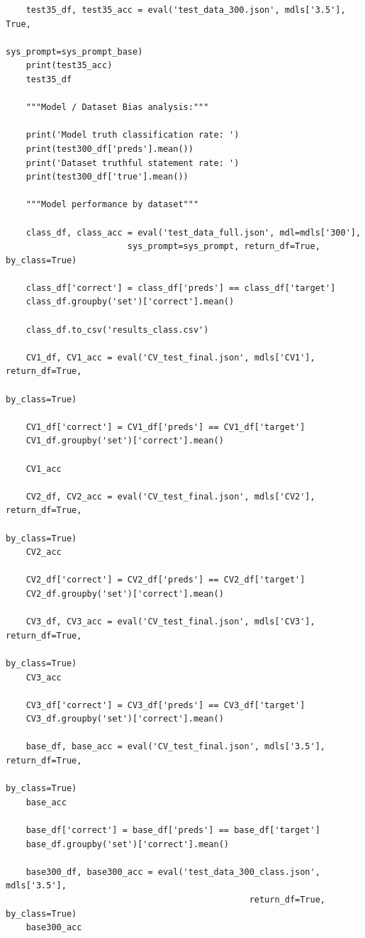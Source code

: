 \documentclass[10pt,twocolumn,letterpaper]{article}
\begin{document}
\begin{verbatim}
    test35_df, test35_acc = eval('test_data_300.json', mdls['3.5'], True, 
                                                        sys_prompt=sys_prompt_base)
    print(test35_acc)
    test35_df
    
    """Model / Dataset Bias analysis:"""
    
    print('Model truth classification rate: ')
    print(test300_df['preds'].mean())
    print('Dataset truthful statement rate: ')
    print(test300_df['true'].mean())
    
    """Model performance by dataset"""
    
    class_df, class_acc = eval('test_data_full.json', mdl=mdls['300'], 
                        sys_prompt=sys_prompt, return_df=True, by_class=True)
    
    class_df['correct'] = class_df['preds'] == class_df['target']
    class_df.groupby('set')['correct'].mean()
    
    class_df.to_csv('results_class.csv')
    
    CV1_df, CV1_acc = eval('CV_test_final.json', mdls['CV1'], return_df=True, 
                                                                by_class=True)
    
    CV1_df['correct'] = CV1_df['preds'] == CV1_df['target']
    CV1_df.groupby('set')['correct'].mean()
    
    CV1_acc
    
    CV2_df, CV2_acc = eval('CV_test_final.json', mdls['CV2'], return_df=True, 
                                                                by_class=True)
    CV2_acc
    
    CV2_df['correct'] = CV2_df['preds'] == CV2_df['target']
    CV2_df.groupby('set')['correct'].mean()
    
    CV3_df, CV3_acc = eval('CV_test_final.json', mdls['CV3'], return_df=True, 
                                                                by_class=True)
    CV3_acc
    
    CV3_df['correct'] = CV3_df['preds'] == CV3_df['target']
    CV3_df.groupby('set')['correct'].mean()
    
    base_df, base_acc = eval('CV_test_final.json', mdls['3.5'], return_df=True, 
                                                                by_class=True)
    base_acc
    
    base_df['correct'] = base_df['preds'] == base_df['target']
    base_df.groupby('set')['correct'].mean()
    
    base300_df, base300_acc = eval('test_data_300_class.json', mdls['3.5'], 
                                                return_df=True, by_class=True)
    base300_acc
    

\end{verbatim}
\end{document}

